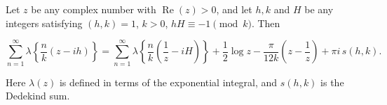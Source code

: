 Let $z$ be any complex number with $\operatorname{Re}(z) > 0$, and let $h, k$ and $H$ be any integers satisfying $(h, k) = 1$, $k > 0$, $hH \equiv -1 \pmod{k}$. Then

$$\sum_{n=1}^{\infty} \lambda\!\left\{ \frac{n}{k} (z - ih) \right\} = \sum_{n=1}^{\infty} \lambda\!\left\{ \frac{n}{k} \left( \frac{1}{z} - iH \right) \right\} + \frac{1}{2} \log z - \frac{\pi}{12k} \left( z - \frac{1}{z} \right) + \pi i\,s(h, k).$$

Here $\lambda(z)$ is defined in terms of the exponential integral, and $s(h,k)$ is the Dedekind sum.
